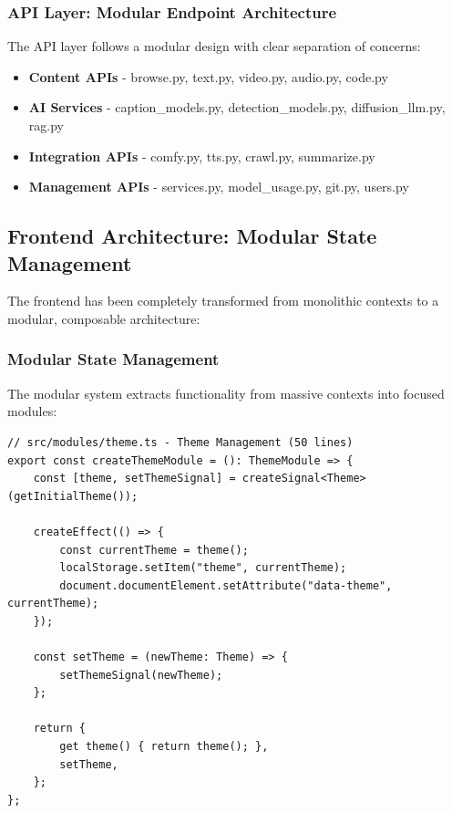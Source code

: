 \documentclass[11pt]{article}
\begin{document}
\subsubsection{API Layer: Modular Endpoint Architecture}

The API layer follows a modular design with clear separation of concerns:

\begin{itemize}
\item \textbf{Content APIs} - browse.py, text.py, video.py, audio.py, code.py
\item \textbf{AI Services} - caption\_models.py, detection\_models.py, diffusion\_llm.py, rag.py
\item \textbf{Integration APIs} - comfy.py, tts.py, crawl.py, summarize.py
\item \textbf{Management APIs} - services.py, model\_usage.py, git.py, users.py
\end{itemize}

\subsection{Frontend Architecture: Modular State Management}

The frontend has been completely transformed from monolithic contexts to a modular, composable architecture:

\subsubsection{Modular State Management}

The modular system extracts functionality from massive contexts into focused modules:

\begin{lstlisting}[style=typescript]
// src/modules/theme.ts - Theme Management (50 lines)
export const createThemeModule = (): ThemeModule => {
    const [theme, setThemeSignal] = createSignal<Theme>(getInitialTheme());

    createEffect(() => {
        const currentTheme = theme();
        localStorage.setItem("theme", currentTheme);
        document.documentElement.setAttribute("data-theme", currentTheme);
    });

    const setTheme = (newTheme: Theme) => {
        setThemeSignal(newTheme);
    };

    return {
        get theme() { return theme(); },
        setTheme,
    };
};
\end{lstlisting}
\end{document}
